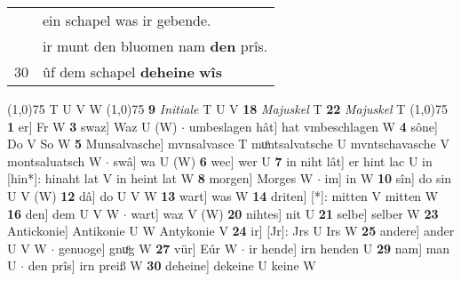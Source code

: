 \documentclass[8pt,a4paper,notitlepage]{article}
\begin{document}
\begin{table}[ht]
\begin{minipage}[t]{0.5\linewidth}
\begin{tabular}{rl}
 & ein schapel was ir gebende.\\ 
 & ir munt den bluomen nam \textbf{den} prîs.\\ 
30 & ûf dem schapel \textbf{deheine} \textbf{wîs}\\ 
\end{tabular}
\scriptsize
\line(1,0){75} \newline
T U V W \newline
\line(1,0){75} \newline
\textbf{9} \textit{Initiale} T U V  \textbf{18} \textit{Majuskel} T  \textbf{22} \textit{Majuskel} T  \newline
\line(1,0){75} \newline
\textbf{1} er] Fr W \textbf{3} swaz] Waz U (W)  $\cdot$ umbeslagen hât] hat vmbeschlagen W \textbf{4} sône] Do V So W \textbf{5} Munsalvasche] mvnsalvasce T muͦntsalvatsche U mvntschavasche V montsaluatsch W  $\cdot$ swâ] wa U (W) \textbf{6} wec] wer U \textbf{7} in niht lât] er hint lac U in [hin*]: hinaht lat V in heint lat W \textbf{8} morgen] Morges W  $\cdot$ im] in W \textbf{10} sîn] do sin U V (W) \textbf{12} dâ] do U V W \textbf{13} wart] was W \textbf{14} driten] [*]: mitten V mitten W \textbf{16} den] dem U V W  $\cdot$ wart] waz V (W) \textbf{20} nihtes] nit U \textbf{21} selbe] selber W \textbf{23} Antickonie] Antikonie U W Antykonie V \textbf{24} ir] [Jr]: Jrs U Irs W \textbf{25} andere] ander U V W  $\cdot$ genuoge] gnuͦg W \textbf{27} vür] Eúr W  $\cdot$ ir hende] irn henden U \textbf{29} nam] man U  $\cdot$ den prîs] irn preiß W \textbf{30} deheine] dekeine U keine W \newline
\end{minipage}
\end{table}
\end{document}
